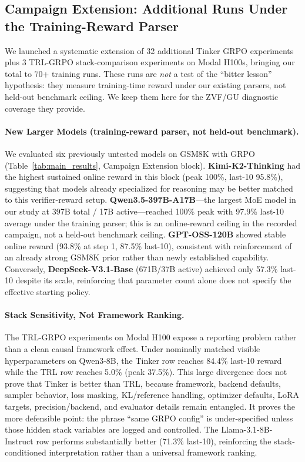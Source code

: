 \subsection{Campaign Extension: Additional Runs Under the Training-Reward Parser}
\label{sec:bitter_lesson}

We launched a systematic extension of 32 additional Tinker GRPO experiments
plus 3 TRL-GRPO stack-comparison experiments on Modal H100s, bringing our
total to 70+ training runs.  These runs are \emph{not} a test of the ``bitter
lesson'' hypothesis: they measure training-time reward under our existing
parsers, not held-out benchmark ceiling.  We keep them here for the ZVF/GU diagnostic
coverage they provide.

\paragraph{New Larger Models (training-reward parser, not held-out benchmark).}
We evaluated six previously untested models on GSM8K with GRPO (Table~\ref{tab:main_results}, Campaign Extension block).
\textbf{Kimi-K2-Thinking} had the highest sustained online reward in this block
(peak 100\%, last-10 95.8\%), suggesting that models already specialized for
reasoning may be better matched to this verifier-reward setup.
\textbf{Qwen3.5-397B-A17B}---the largest MoE model in our study at 397B total /
17B active---reached 100\% peak with 97.9\% last-10 average under
the training parser; this is an online-reward ceiling in the recorded campaign,
not a held-out benchmark ceiling. \textbf{GPT-OSS-120B} showed stable online
reward (93.8\% at step 1, 87.5\% last-10), consistent with reinforcement of an
already strong GSM8K prior rather than newly established capability. Conversely,
\textbf{DeepSeek-V3.1-Base} (671B/37B active) achieved only 57.3\% last-10
despite its scale, reinforcing that parameter count alone does not specify the
effective starting policy.

\paragraph{Stack Sensitivity, Not Framework Ranking.}
The TRL-GRPO experiments on Modal H100 expose a reporting problem rather than
a clean causal framework effect.  Under nominally matched visible
hyperparameters on Qwen3-8B, the Tinker row reaches 84.4\% last-10 reward while the TRL row reaches
5.0\% (peak 37.5\%).  This large divergence does not prove that Tinker is
better than TRL, because framework, backend defaults, sampler behavior,
loss masking, KL/reference handling, optimizer defaults, LoRA targets, precision/backend,
and evaluator details remain entangled.  It proves the more defensible point:
the phrase ``same GRPO config'' is under-specified unless those hidden stack
variables are logged and controlled.  The Llama-3.1-8B-Instruct row performs
substantially better (71.3\% last-10), reinforcing the stack-conditioned
interpretation rather than a universal framework ranking.

